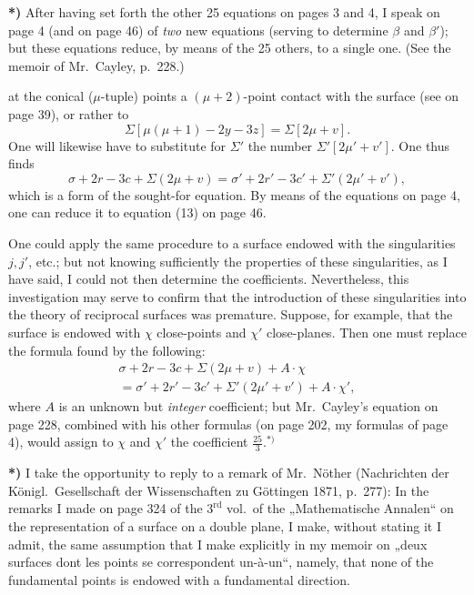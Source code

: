 \documentclass{article}
\begin{document}
\textbf{*)} After having set forth the other 25 equations on pages 3 and 4, I speak on page 4 (and on page 46) of \emph{two} new equations (serving to determine $\beta$ and $\beta'$); but these equations reduce, by means of the 25 others, to a single one. (See the memoir of Mr.~Cayley, p.~228.)

at the conical ($\mu$-tuple) points a $(\mu + 2)$-point contact with the surface (see on page 39), or rather to
\[
\Sigma [\mu(\mu + 1) - 2y - 3z] = \Sigma [2\mu + v].
\]
One will likewise have to substitute for $\Sigma'$ the number $\Sigma' [2\mu' + v']$. One thus finds
\[
\sigma + 2r - 3c + \Sigma(2\mu + v) = \sigma' + 2r' - 3c' + \Sigma'(2\mu' + v'),
\]
which is a form of the sought-for equation. By means of the equations on page 4, one can reduce it to equation (13) on page 46.

One could apply the same procedure to a surface endowed with the singularities $j, j'$, etc.; but not knowing sufficiently the properties of these singularities, as I have said, I could not then determine the coefficients. Nevertheless, this investigation may serve to confirm that the introduction of these singularities into the theory of reciprocal surfaces was premature. Suppose, for example, that the surface is endowed with $\chi$ close-points and $\chi'$ close-planes. Then one must replace the formula found by the following:
\[
\begin{aligned}
\sigma + 2r - 3c + \Sigma(2\mu + v) + A \cdot \chi \\
= \sigma' + 2r' - 3c' + \Sigma'(2\mu' + v') + A \cdot \chi',
\end{aligned}
\]
where $A$ is an unknown but \emph{integer} coefficient; but Mr.~Cayley's equation on page 228, combined with his other formulas (on page 202, my formulas of page 4), would assign to $\chi$ and $\chi'$ the coefficient $\frac{25}{3}$.${}^{*)}$

\textbf{*)} I take the opportunity to reply to a remark of Mr.~Nöther (Nachrichten der Königl.\ Gesellschaft der Wissenschaften zu Göttingen 1871, p.~277): In the remarks I made on page 324 of the $3^{\text{rd}}$ vol.\ of the „Mathematische Annalen“ on the representation of a surface on a double plane, I make, without stating it I admit, the same assumption that I make explicitly in my memoir on „deux surfaces dont les points se correspondent un-à-un“, namely, that none of the fundamental points is endowed with a fundamental direction.
\end{document}
